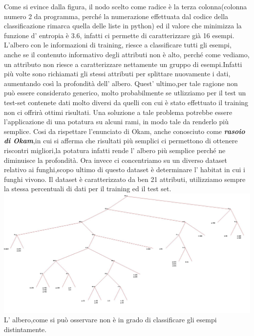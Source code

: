		 Come si evince dalla figura, il nodo scelto come radice è la terza colonna(colonna numero 2 da programma, perché la numerazione effettuata dal codice della classificazione rimarca quella delle liste in python) ed il valore che  minimizza la funzione d' entropia è 3.6, infatti ci permette di caratterizzare già 16 esempi.
		  L'albero con le informazioni di training, riesce a classificare tutti gli esempi, anche se il contenuto informativo degli attributi non è alto, perché come vediamo, un attributo non riesce a caratterizzare nettamente un gruppo di esempi.Infatti più volte sono richiamati gli stessi attributi per splittare nuovamente i dati, aumentando così la profondità dell' albero. \newline Quest' ultimo,per tale ragione non può essere considerato generico, molto probabilmente se utlizziamo per il test un test-set contenete dati molto diversi da quelli con cui è stato effettuato il training non ci offrirà ottimi risultati. 
		  \newline Una soluzione a tale problema potrebbe essere l'applicazione di una potatura su alcuni rami, in modo tale da renderlo più semplice.
		  \newline Cosi da rispettare l'enunciato di Okam, anche conosciuto come  \textbf{\textit{rasoio di Okam}},in cui si afferma che risultati più semplici ci permettono di ottenere riscontri migliori,la potatura infatti rende l' albero più semplice perché ne diminuisce la profondità.
		\newline
		\newline
		Ora invece ci concentriamo su un diverso dataset relativo ai funghi,scopo ultimo di questo dataset è determinare l' habitat in cui i funghi vivono. Il dataset è caratterizzato da ben 21 attributi, utilizziamo sempre la stessa percentuali di dati per il training ed il test set.
		\includegraphics[width=.9\textwidth, height=0.63\textheight]{mushroom.jpg}		
		\newline L' albero,come si può osservare non è in grado di classificare gli esempi distintamente.
